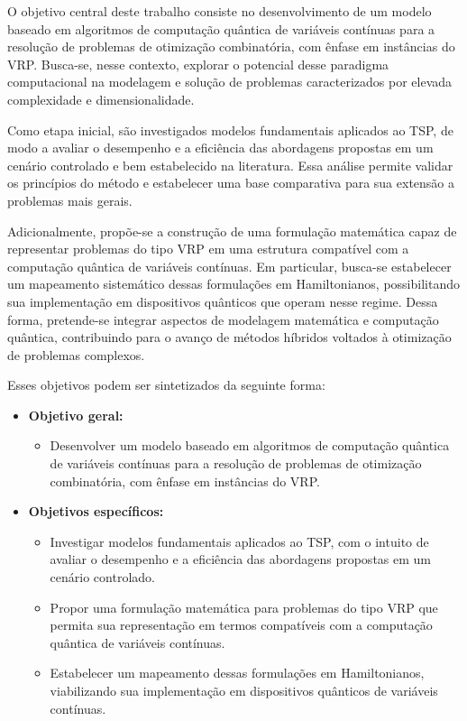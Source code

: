 O objetivo central deste trabalho consiste no desenvolvimento de um modelo baseado em algoritmos de computação quântica de variáveis contínuas para a resolução de problemas de otimização combinatória, com ênfase em instâncias do VRP. Busca-se, nesse contexto, explorar o potencial desse paradigma computacional na modelagem e solução de problemas caracterizados por elevada complexidade e dimensionalidade.

Como etapa inicial, são investigados modelos fundamentais aplicados ao TSP, de modo a avaliar o desempenho e a eficiência das abordagens propostas em um cenário controlado e bem estabelecido na literatura. Essa análise permite validar os princípios do método e estabelecer uma base comparativa para sua extensão a problemas mais gerais.

Adicionalmente, propõe-se a construção de uma formulação matemática capaz de representar problemas do tipo VRP em uma estrutura compatível com a computação quântica de variáveis contínuas. Em particular, busca-se estabelecer um mapeamento sistemático dessas formulações em Hamiltonianos, possibilitando sua implementação em dispositivos quânticos que operam nesse regime. Dessa forma, pretende-se integrar aspectos de modelagem matemática e computação quântica, contribuindo para o avanço de métodos híbridos voltados à otimização de problemas complexos.

Esses objetivos podem ser sintetizados da seguinte forma:
\begin{itemize}
    \item \textbf{Objetivo geral:}
    \begin{itemize}
        \item Desenvolver um modelo baseado em algoritmos de computação quântica de variáveis contínuas para a resolução de problemas de otimização combinatória, com ênfase em instâncias do VRP.
    \end{itemize}

    \item \textbf{Objetivos específicos:}
    \begin{itemize}
        \item Investigar modelos fundamentais aplicados ao TSP, com o intuito de avaliar o desempenho e a eficiência das abordagens propostas em um cenário controlado.

        \item Propor uma formulação matemática para problemas do tipo VRP que permita sua representação em termos compatíveis com a computação quântica de variáveis contínuas.

        \item Estabelecer um mapeamento dessas formulações em Hamiltonianos, viabilizando sua implementação em dispositivos quânticos de variáveis contínuas.
    \end{itemize}
\end{itemize}

